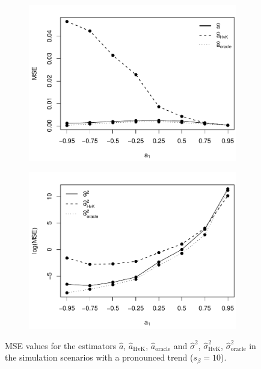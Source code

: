 \begin{figure}[t!]
\begin{subfigure}[b]{0.475\textwidth}
\includegraphics[width=\textwidth]{Plots/MSE_a1_T=500_slope=10_(q,K1,K2,M1,M2)=(25,2,10,20,30).pdf}
\end{subfigure}\hspace{0.25cm}
\begin{subfigure}[b]{0.475\textwidth}
\includegraphics[width=\textwidth]{Plots/MSE_lrv_T=500_slope=10_(q,K1,K2,M1,M2)=(25,2,10,20,30).pdf}
\end{subfigure}
\caption{MSE values for the estimators $\widehat{a}$, $\widehat{a}_{\text{HvK}}$, $\widehat{a}_{\text{oracle}}$ and $\widehat{\sigma}^2$, $\widehat{\sigma}^2_{\text{HvK}}$, $\widehat{\sigma}^2_{\text{oracle}}$ in the simulation scenarios with a pronounced trend ($s_\beta=10$).}\label{fig:MSE_slope10}
\end{figure}


